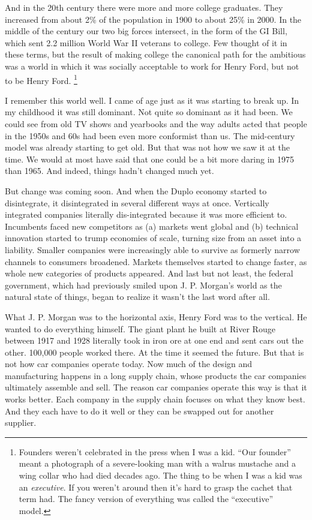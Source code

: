 And in the 20th century there were more and more college graduates. They
increased from about 2\% of the population in 1900 to about 25\% in
2000. In the middle of the century our two big forces intersect, in the
form of the GI Bill, which sent 2.2 million World War II veterans to
college. Few thought of it in these terms, but the result of making
college the canonical path for the ambitious was a world in which it was
socially acceptable to work for Henry Ford, but not to be Henry Ford.
\footnote{Founders weren't celebrated in the press when I was a kid.
``Our founder'' meant a photograph of a severe-looking man with a walrus
mustache and a wing collar who had died decades ago. The thing to be
when I was a kid was an \emph{executive}. If you weren't around then
it's hard to grasp the cachet that term had. The fancy version of
everything was called the ``executive'' model.}

I remember this world well. I came of age just as it was starting to
break up. In my childhood it was still dominant. Not quite so dominant
as it had been. We could see from old TV shows and yearbooks and the way
adults acted that people in the 1950s and 60s had been even more
conformist than us. The mid-century model was already starting to get
old. But that was not how we saw it at the time. We would at most have
said that one could be a bit more daring in 1975 than 1965. And indeed,
things hadn't changed much yet.

But change was coming soon. And when the Duplo economy started to
disintegrate, it disintegrated in several different ways at once.
Vertically integrated companies literally dis-integrated because it was
more efficient to. Incumbents faced new competitors as (a) markets went
global and (b) technical innovation started to trump economies of scale,
turning size from an asset into a liability. Smaller companies were
increasingly able to survive as formerly narrow channels to consumers
broadened. Markets themselves started to change faster, as whole new
categories of products appeared. And last but not least, the federal
government, which had previously smiled upon J. P. Morgan's world as the
natural state of things, began to realize it wasn't the last word after
all.

What J. P. Morgan was to the horizontal axis, Henry Ford was to the
vertical. He wanted to do everything himself. The giant plant he built
at River Rouge between 1917 and 1928 literally took in iron ore at one
end and sent cars out the other. 100,000 people worked there. At the
time it seemed the future. But that is not how car companies operate
today. Now much of the design and manufacturing happens in a long supply
chain, whose products the car companies ultimately assemble and sell.
The reason car companies operate this way is that it works better. Each
company in the supply chain focuses on what they know best. And they
each have to do it well or they can be swapped out for another supplier.

